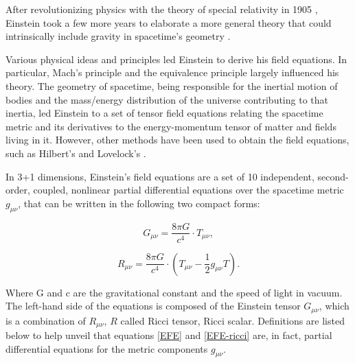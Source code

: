 After revolutionizing physics with the theory of special relativity in 1905 \cite{Einstein:1905}, Einstein took a few more years to elaborate a more general theory that could intrinsically include gravity in spacetime's geometry \cite{Einstein:1915ca}.

Various physical ideas and principles led Einstein to derive his field equations. In particular, Mach's principle \cite{mach1919science, 1995mpfn.conf.....B} and the equivalence principle largely influenced his theory. The geometry of spacetime, being responsible for the inertial motion of bodies and the mass/energy distribution of the universe contributing to that inertia, led Einstein to a set of tensor field equations relating the spacetime metric and its derivatives to the energy-momentum tensor of matter and fields living in it. However, other methods have been used to obtain the field equations, such as Hilbert's \cite{Hilbert:1915tx} and Lovelock's \cite{Lovelock:1971yv}. 

In 3+1 dimensions, Einstein's field equations are a set of 10 independent, second-order, coupled, nonlinear partial differential equations over the spacetime metric $g_{\mu \nu}$, that can be written in the following two compact forms:

\begin{equation}\label{EFE}
G_{\mu\nu}  =  \frac{8\pi G}{c^4} \cdot T_{\mu\nu},
\end{equation}

\begin{equation}\label{EFE-ricci}
R_{\mu\nu}  =  \frac{8\pi G}{c^4} \cdot (T_{\mu\nu} - \frac{1}{2} g_{\mu\nu} T).
\end{equation}

Where G and c are the gravitational constant and the speed of light in vacuum. The left-hand side of the equations is composed of the Einstein tensor $G_{\mu\nu}$, which is a combination of $R_{\mu\nu}$, $R$ called Ricci tensor, Ricci scalar. Definitions are listed below to help unveil that equations \ref{EFE} and \ref{EFE-ricci} are, in fact, partial differential equations for the metric components $g_{\mu\nu}$.


